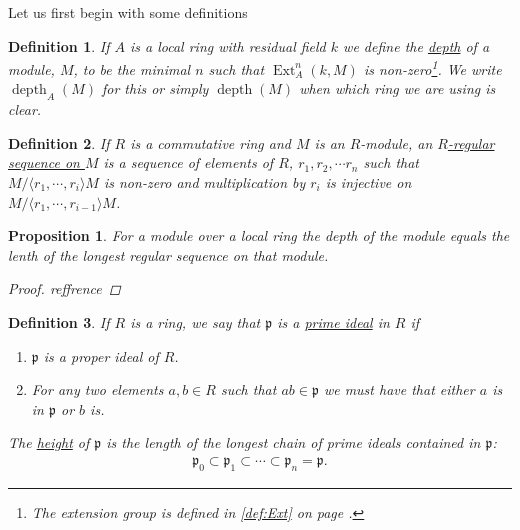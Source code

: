 \documentclass[11pt, a4paper, english]{article}
\newtheorem{prop}{Proposition}
\numberwithin{prop}{section}
\numberwithin{lemma}{section}
\numberwithin{theorem}{section}
\newtheorem{defin}{Definition}
\numberwithin{defin}{section}
\numberwithin{example}{section}
\DeclareMathOperator{\Ext}{Ext}
\DeclareMathOperator{\depth}{depth}
\begin{document}
Let us first begin with some definitions
\begin{defin}
If $A$ is a local ring with residual field $k$ we define the \underline{depth} of a module, $M$, to be the minimal $n$ such that $\Ext^n_A(k, M)$ is non-zero\footnote{The extension group is defined in \cref{def:Ext} on page \pageref{def:Ext}.}. We write $\depth_A(M)$ for this or simply $\depth(M)$ when which ring we are using is clear.
\end{defin}

\begin{defin}
\label{def:regular_seq}
If $R$ is a commutative ring and $M$ is an $R$-module, an \underline{$R$-regular sequence on $M$} is a sequence of elements of $R$, $r_1, r_2, \cdots r_n$ such that $M/\langle r_1, \cdots, r_i \rangle M$ is non-zero and multiplication by $r_i$ is injective on $M/\langle r_1, \cdots, r_{i-1} \rangle M$.
\end{defin}

\begin{prop}
For a module over a local ring the depth of the module equals the lenth of the longest regular sequence on that module.
\begin{proof}
{\color{red} reffrence}
\end{proof}
\end{prop}

\begin{defin}
If $R$ is a ring, we say that $\mathfrak{p}$ is  a \underline{prime ideal} in $R$ if
\begin{enumerate}
\item $\mathfrak{p}$ is a proper ideal of $R$.
\item For any two elements $a,b \in R$ such that $ab \in \mathfrak{p}$ we must have that either $a$ is in $\mathfrak{p}$ or $b$ is.
\end{enumerate}
The \underline{height} of $\mathfrak{p}$ is the length of the longest chain of prime ideals contained in $\mathfrak{p}$:
\begin{align*}
\mathfrak{p}_0 \subset \mathfrak{p}_1 \subset \cdots \subset \mathfrak{p}_n = \mathfrak{p}.
\end{align*}
\end{defin}
\end{document}
